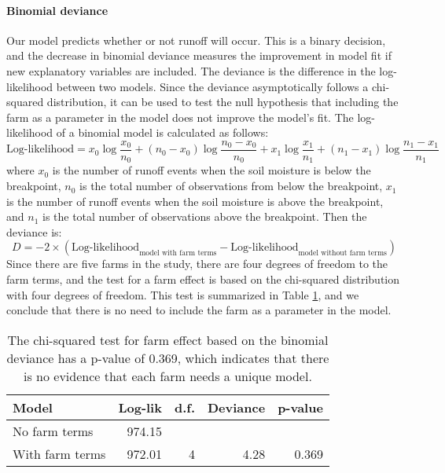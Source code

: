 \documentclass[11pt]{article}
\begin{document}
\paragraph{Binomial deviance}
Our model  predicts whether or not runoff will occur. This is a binary decision, and the decrease in binomial deviance measures the improvement in model fit if new explanatory variables are included. The deviance is the difference in the log-likelihood between two models. Since the deviance asymptotically follows a chi-squared distribution, it can be used to test the null hypothesis that including the farm as a parameter in the model does not improve the model's fit. The log-likelihood of a binomial model is calculated as follows:
\[
\text{Log-likelihood} = x_0 \log{\frac{x_0}{n_0}} + (n_0-x_0) \log{\frac{n_0-x_0}{n_0}} + x_1 \log{\frac{x_1}{n_1}} + (n_1-x_1) \log{\frac{n_1-x_1}{n_1}}
\]
where $x_0$ is the number of runoff events when the soil moisture is below the breakpoint, $n_0$ is the total number of observations from below the breakpoint, $x_1$ is the number of runoff events when the soil moisture is above the breakpoint, and  $n_1$ is the total number of observations above the breakpoint. Then the deviance is:
\[
D = -2 \times (\text{Log-likelihood}_{\text{model with farm terms}} - \text{Log-likelihood}_{\text{model without farm terms}})
\]
Since there are five farms in the study, there are four degrees of freedom to the farm terms, and the test for a farm effect is based on the chi-squared distribution with four degrees of freedom. This test is summarized in Table \ref{breakpoint_test}, and we conclude that there is no need to include the farm as a parameter in the model.\*

\begin{table}[h!]
	\centering
	\linespread{1}
	\begin{tabular}{l r r r r}
		Model & Log-lik & d.f. & Deviance & p-value \\
		\hline 
		No farm terms & 974.15 & & & \\
		With farm terms & 972.01 & 4 & 4.28 & 0.369 \\
	\end{tabular}
	\caption{The chi-squared test for farm effect based on the binomial deviance has a p-value of 0.369, which indicates that there is no evidence that each farm needs a unique model. \label{breakpoint_test}}
	\linespread{2}
\end{table}
	
\end{document}
